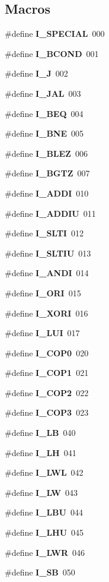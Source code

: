 \subsection*{Macros}
\begin{DoxyCompactItemize}
\item 
\#define {\bf I\+\_\+\+S\+P\+E\+C\+I\+AL}~000
\item 
\#define {\bf I\+\_\+\+B\+C\+O\+ND}~001
\item 
\#define {\bf I\+\_\+J}~002
\item 
\#define {\bf I\+\_\+\+J\+AL}~003
\item 
\#define {\bf I\+\_\+\+B\+EQ}~004
\item 
\#define {\bf I\+\_\+\+B\+NE}~005
\item 
\#define {\bf I\+\_\+\+B\+L\+EZ}~006
\item 
\#define {\bf I\+\_\+\+B\+G\+TZ}~007
\item 
\#define {\bf I\+\_\+\+A\+D\+DI}~010
\item 
\#define {\bf I\+\_\+\+A\+D\+D\+IU}~011
\item 
\#define {\bf I\+\_\+\+S\+L\+TI}~012
\item 
\#define {\bf I\+\_\+\+S\+L\+T\+IU}~013
\item 
\#define {\bf I\+\_\+\+A\+N\+DI}~014
\item 
\#define {\bf I\+\_\+\+O\+RI}~015
\item 
\#define {\bf I\+\_\+\+X\+O\+RI}~016
\item 
\#define {\bf I\+\_\+\+L\+UI}~017
\item 
\#define {\bf I\+\_\+\+C\+O\+P0}~020
\item 
\#define {\bf I\+\_\+\+C\+O\+P1}~021
\item 
\#define {\bf I\+\_\+\+C\+O\+P2}~022
\item 
\#define {\bf I\+\_\+\+C\+O\+P3}~023
\item 
\#define {\bf I\+\_\+\+LB}~040
\item 
\#define {\bf I\+\_\+\+LH}~041
\item 
\#define {\bf I\+\_\+\+L\+WL}~042
\item 
\#define {\bf I\+\_\+\+LW}~043
\item 
\#define {\bf I\+\_\+\+L\+BU}~044
\item 
\#define {\bf I\+\_\+\+L\+HU}~045
\item 
\#define {\bf I\+\_\+\+L\+WR}~046
\item 
\#define {\bf I\+\_\+\+SB}~050
\item 

\end{DoxyCompactItemize}
